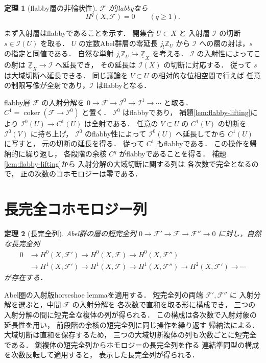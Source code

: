 \documentclass[a5paper,10pt,onecolumn]{jsarticle}
\makeatletter
\theoremstyle{mathnotetheorem}
\newtheorem{theorem}{定理}[section]
\renewcommand{\proofname}{証明}
\renewenvironment{proof}[1][\proofname]{%
  \par\pushQED{\qed}\normalfont\topsep4\p@\@plus2\p@\relax
  \trivlist\item[\hskip\labelsep\bfseries #1]\ignorespaces
}{\popQED\endtrivlist\@endpefalse}
\makeatother
\begin{document}
\begin{theorem}[flabby層の非輪状性]\label{thm:flabby-acyclic}
$\mathcal F$ がflabbyなら
\[
 H^q(X,\mathcal F)=0\qquad(q\ge1).
\]
\end{theorem}
\begin{proof}
まず入射層はflabbyであることを示す．
開集合 $U\subset X$ と
入射層 $\mathcal I$ の切断 $s\in\mathcal I(U)$ を取る．
$U$ の定数Abel群層の零延長 $j_!\mathbb Z_U$ から
$\mathcal I$ への層の射は，$s$ の指定と同値である．
自然な単射
$j_!\mathbb Z_U\hookrightarrow\underline{\mathbb Z}_X$
を考える．
$\mathcal I$ の入射性によってこの射は
$\underline{\mathbb Z}_X\to\mathcal I$ へ延長でき，
その延長は $\mathcal I(X)$ の切断に対応する．
従って $s$ は大域切断へ延長できる．
同じ議論を $V\subset U$ の相対的な位相空間で行えば
任意の制限写像が全射であり，$\mathcal I$ はflabbyとなる．

flabby層 $\mathcal F$ の入射分解を
$0\to\mathcal F\to\mathcal I^0\to\mathcal I^1\to\cdots$
と取る．
$C^1=\operatorname{coker}(\mathcal F\to\mathcal I^0)$ と置く．
$\mathcal I^0$ はflabbyであり，
補題\ref{lem:flabby-lifting}により
$\mathcal I^0(U)\to C^1(U)$ は全射である．
任意の $V\subset U$ の $C^1(V)$ の切断を
$\mathcal I^0(V)$ に持ち上げ，
$\mathcal I^0$ のflabby性によって
$\mathcal I^0(U)$ へ延長してから $C^1(U)$ に写すと，
元の切断の延長を得る．
従って $C^1$ もflabbyである．
この操作を帰納的に繰り返し，
各段階の余核 $C^q$ がflabbyであることを得る．
補題\ref{lem:flabby-lifting}から
入射分解の大域切断に関する列は
各次数で完全となるので，
正の次数のコホモロジーは零である．
\end{proof}

\section{長完全コホモロジー列}

\begin{theorem}[長完全列]\label{thm:sheaf-long}
Abel群の層の短完全列
$0\to\mathcal F'\to\mathcal F\to\mathcal F''\to0$
に対し，自然な長完全列
\[
 \begin{aligned}
 0&\to H^0(X,\mathcal F')\to H^0(X,\mathcal F)
 \to H^0(X,\mathcal F'')\\
 &\to H^1(X,\mathcal F')\to H^1(X,\mathcal F)
 \to H^1(X,\mathcal F'')\to H^2(X,\mathcal F')\to\cdots
 \end{aligned}
\]
が存在する．
\end{theorem}
\begin{proof}
Abel圏の入射版horseshoe lemmaを適用する．
短完全列の両端 $\mathcal F',\mathcal F''$ に
入射分解を選ぶと，中間 $\mathcal F$ の入射分解を
各次数で直和を取る形に構成でき，
三つの入射分解の間に短完全な複体の列が得られる．
この構成は各次数で入射対象の延長性を用い，
前段階の余核の短完全列に同じ操作を繰り返す
帰納法による．
大域切断は直和を保存するため，
三つの大域切断複体の列も次数ごとに短完全である．
鎖複体の短完全列からホモロジーの長完全列を作る
連結準同型の構成を次数反転して適用すると，
表示した長完全列が得られる．
\end{proof}
\end{document}
